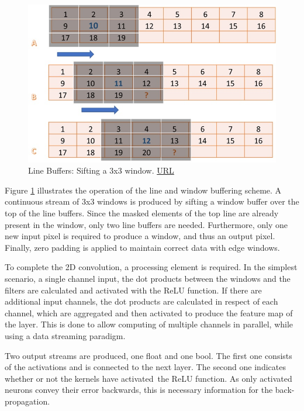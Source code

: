 \begin{figure}[H]
    \centering
        \includegraphics[width=1\textwidth]{Images/diagrams/line_buf_conv.jpg}
        \decoRule
        \caption[Line Buffers, Convolution]{Line Buffers: Sifting a 3x3 window. \href{https://github.com/Xilinx/Vitis-Tutorials/blob/2022.1/Hardware_Acceleration/Design_Tutorials/01-convolution-tutorial/lab2_conv_filter_kernel_design.md}{URL} }
        \label{fig: Line Buffers Convolution}
\end{figure}

Figure \ref{fig: Line Buffers Convolution} illustrates the operation of the line and window buffering scheme. A continuous stream of 3x3 windows is produced by sifting a window buffer over the top of the line buffers. Since the masked elements of the top line are already present in the window, only two line buffers are needed. Furthermore, only one new input pixel is required to produce a window, and thus an output pixel. Finally, zero padding is applied to maintain correct data with edge windows.

To complete the 2D convolution, a processing element is required. In the simplest scenario, a single channel input, the dot products between the windows and the filters are calculated and activated with the ReLU function. If there are additional input channels, the dot products are calculated in respect of each channel, which are aggregated and then activated to produce the feature map of the layer. This is done to allow computing of multiple channels in parallel, while using a data streaming paradigm.

Two output streams are produced, one float and one bool. The first one consists of the activations and is connected to the next layer. The second one indicates whether or not the kernels have activated the ReLU function. As only activated neurons convey their error backwards, this is necessary information for the back-propagation.

